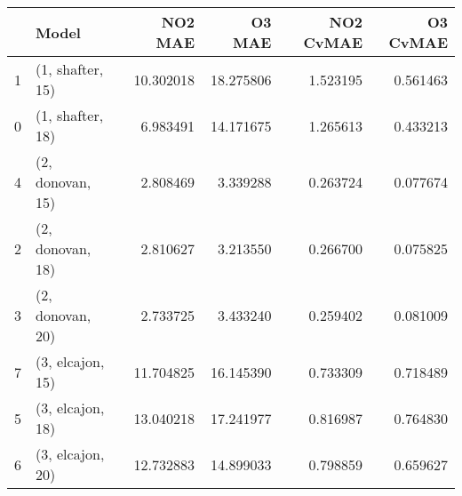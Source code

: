 \begin{tabular}{llrrrr}
\toprule
{} &             Model &    NO2 MAE &     O3 MAE &  NO2 CvMAE &  O3 CvMAE \\
\midrule
1 &  (1, shafter, 15) &  10.302018 &  18.275806 &   1.523195 &  0.561463 \\
0 &  (1, shafter, 18) &   6.983491 &  14.171675 &   1.265613 &  0.433213 \\
4 &  (2, donovan, 15) &   2.808469 &   3.339288 &   0.263724 &  0.077674 \\
2 &  (2, donovan, 18) &   2.810627 &   3.213550 &   0.266700 &  0.075825 \\
3 &  (2, donovan, 20) &   2.733725 &   3.433240 &   0.259402 &  0.081009 \\
7 &  (3, elcajon, 15) &  11.704825 &  16.145390 &   0.733309 &  0.718489 \\
5 &  (3, elcajon, 18) &  13.040218 &  17.241977 &   0.816987 &  0.764830 \\
6 &  (3, elcajon, 20) &  12.732883 &  14.899033 &   0.798859 &  0.659627 \\
\bottomrule
\end{tabular}
